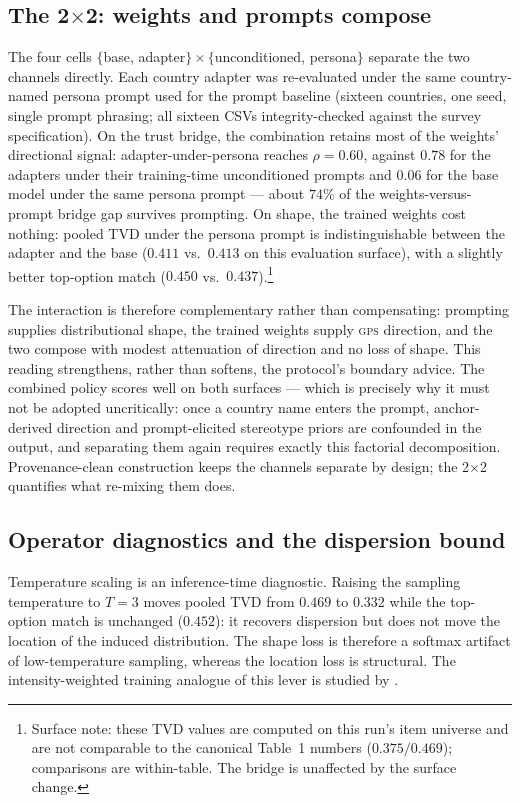 \documentclass[10pt,letterpaper]{article}
\newcommand{\GPS}{\textsc{gps}}
\begin{document}
\subsection{The 2$\times$2: weights and prompts compose}\label{sec:twobytwo}
The four cells $\{$base, adapter$\}\times\{$unconditioned, persona$\}$ separate the two channels directly. Each country adapter was re-evaluated under the same country-named persona prompt used for the prompt baseline (sixteen countries, one seed, single prompt phrasing; all sixteen CSVs integrity-checked against the survey specification). On the trust bridge, the combination retains most of the weights' directional signal: adapter-under-persona reaches $\rho=0.60$, against $0.78$ for the adapters under their training-time unconditioned prompts and $0.06$ for the base model under the same persona prompt --- about $74\%$ of the weights-versus-prompt bridge gap survives prompting. On shape, the trained weights cost nothing: pooled TVD under the persona prompt is indistinguishable between the adapter and the base ($0.411$ vs.\ $0.413$ on this evaluation surface), with a slightly better top-option match ($0.450$ vs.\ $0.437$).\footnote{Surface note: these TVD values are computed on this run's item universe and are not comparable to the canonical Table~1 numbers ($0.375/0.469$); comparisons are within-table. The bridge is unaffected by the surface change.}

The interaction is therefore complementary rather than compensating: prompting supplies distributional shape, the trained weights supply \GPS{} direction, and the two compose with modest attenuation of direction and no loss of shape. This reading strengthens, rather than softens, the protocol's boundary advice. The combined policy scores well on both surfaces --- which is precisely why it must not be adopted uncritically: once a country name enters the prompt, anchor-derived direction and prompt-elicited stereotype priors are confounded in the output, and separating them again requires exactly this factorial decomposition. Provenance-clean construction keeps the channels separate by design; the 2$\times$2 quantifies what re-mixing them does.

\subsection{Operator diagnostics and the dispersion bound}
Temperature scaling is an inference-time diagnostic. Raising the sampling temperature to $T=3$ moves pooled TVD from $0.469$ to $0.332$ while the top-option match is unchanged ($0.452$): it recovers dispersion but does not move the location of the induced distribution. The shape loss is therefore a softmax artifact of low-temperature sampling, whereas the location loss is structural. The intensity-weighted training analogue of this lever is studied by \cite{sharifnassab2024}.
\end{document}
